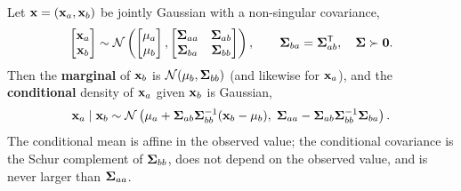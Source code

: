 \begin{theorem}
\label{thm:appB-conditioning}
Let $\mathbf{x} = (\mathbf{x}_a, \mathbf{x}_b)$ be jointly Gaussian with a non-singular covariance,
\begin{equation}
  \begin{bmatrix}\mathbf{x}_a\\ \mathbf{x}_b\end{bmatrix} \sim
  \mathcal{N}\left(\begin{bmatrix}\mathbf{\mu}_a\\ \mathbf{\mu}_b\end{bmatrix},
  \begin{bmatrix}\mathbf{\Sigma}_{aa} & \mathbf{\Sigma}_{ab}\\ \mathbf{\Sigma}_{ba} & \mathbf{\Sigma}_{bb}\end{bmatrix}\right),
  \qquad \mathbf{\Sigma}_{ba} = \mathbf{\Sigma}_{ab}^{\mathsf{T}},\quad \mathbf{\Sigma} \succ \mathbf{0}.
  \label{eq:appB-joint}
\end{equation}
Then the \textbf{marginal} of $\mathbf{x}_b$ is $\mathcal{N}(\mathbf{\mu}_b, \mathbf{\Sigma}_{bb})$ (and likewise for $\mathbf{x}_a$), and the \textbf{conditional} density of $\mathbf{x}_a$ given $\mathbf{x}_b$ is Gaussian,
\begin{equation}
  \mathbf{x}_a \mid \mathbf{x}_b \sim \mathcal{N}\left(\mathbf{\mu}_a + \mathbf{\Sigma}_{ab}\mathbf{\Sigma}_{bb}^{-1}(\mathbf{x}_b - \mathbf{\mu}_b),\;
  \mathbf{\Sigma}_{aa} - \mathbf{\Sigma}_{ab}\mathbf{\Sigma}_{bb}^{-1}\mathbf{\Sigma}_{ba}\right).
  \label{eq:appB-conditional}
\end{equation}
The conditional mean is affine in the observed value; the conditional covariance is the Schur complement of $\mathbf{\Sigma}_{bb}$, does not depend on the observed value, and is never larger than $\mathbf{\Sigma}_{aa}$.
\end{theorem}
